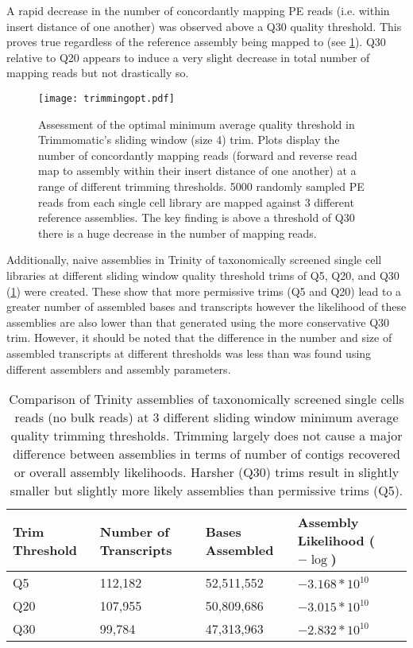 A rapid decrease in the number of concordantly mapping PE reads (i.e.
within insert distance of one another) was observed above a Q30 quality threshold.
This proves true regardless of the reference assembly being mapped to
(see \cref{fig:trimmingopt}).  Q30 relative to Q20 appears to induce a 
very slight decrease in total number of mapping reads but not drastically so. 

\begin{figure}[hp]
	\centering
    \texttt{[image: trimmingopt.pdf]}
    \caption{Assessment of the optimal minimum average quality threshold
             in Trimmomatic's sliding window (size 4) trim.  Plots
             display the number of concordantly mapping reads (forward
                 and reverse read map to assembly within their insert
             distance of one another) at a range of different trimming
             thresholds.  5000 randomly sampled PE reads 
             from each single cell library are mapped against 3 different 
             reference assemblies. 
             The key finding is above a threshold of Q30 there is a huge
         decrease in the number of mapping reads.}
         \label{fig:trimmingopt}
\end{figure}

Additionally, naive assemblies in Trinity of taxonomically screened single cell libraries
at different sliding window quality threshold trims of Q5, Q20, and Q30 (\cref{tab:trim_assembly})
were created. 
These show that more permissive trims (Q5 and Q20) lead to a greater number of assembled bases and transcripts 
however the likelihood of these assemblies are also lower than that generated using the 
more conservative Q30 trim. 
However, it should be noted that the difference in the number and size of assembled transcripts at different thresholds 
was less than was found using different assemblers and assembly parameters.

\begin{table}[h!]
     \begin{tabularx}{\textwidth}{|l| l |l |l|}
     	\hline
         \textbf{Trim Threshold} & \textbf{Number of Transcripts} & \textbf{Bases Assembled} & \textbf{Assembly Likelihood (\(-\log\))} \\
         \hline
         Q5 &  112,182 & 52,511,552 & \(-3.168*10^{10}\) \\
         Q20 & 107,955 & 50,809,686 & \(-3.015*10^{10}\) \\
         Q30 & 99,784 & 47,313,963 &  \(-2.832*10^{10}\) \\ 
    \hline
    \end{tabularx}
    \caption{Comparison of Trinity assemblies of taxonomically screened
        single cells reads (no bulk reads) at 3 different sliding window
        minimum average quality trimming thresholds.  Trimming largely
        does not cause a major difference between assemblies in terms of number
        of contigs recovered or overall assembly likelihoods.  Harsher (Q30) trims 
        result in slightly smaller but slightly more likely assemblies than permissive
        trims (Q5).
    }
    \label{tab:trim_assembly}
\end{table}

